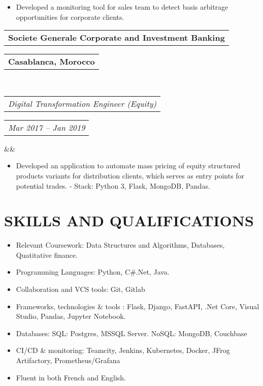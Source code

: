 \documentclass[11pt,a4paper,roman]{moderncv}        %
\makeatletter
\newcommand*{\customcventry}[7][.25em]{
  \begin{tabular}{@{}l} 
    {\bfseries #4}
  \end{tabular}
  \hfill%
  \begin{tabular}{l@{}}
     {\bfseries #5}
  \end{tabular} \\
  \begin{tabular}{@{}l} 
    {\itshape #3}
  \end{tabular}
  \hfill%
  \begin{tabular}{l@{}}
     {\itshape #2}
  \end{tabular}
  \ifx&#7&%
  \else{\\%
    \begin{minipage}{\maincolumnwidth}%
      \small#7%
    \end{minipage}}\fi%
  \par\addvspace{#1}}
\makeatother
\begin{document}
{{{{{\begin{itemize}
  	\newline - Stack: Python 3 (Pandas, Numpy), Flask, MongoDB, ElasticSearch Kibana.
  \item Developed a monitoring tool for sales team to detect basis arbitrage opportunities for corporate clients.
  
\end{itemize}
}

{\customcventry{Mar 2017 – Jan 2019}{Digital Transformation Engineer (Equity)}{Societe Generale Corporate and Investment Banking}{Casablanca, Morocco}{}{}
{\begin{itemize}
  \item Developed an application to automate mass pricing of equity structured products variants for distribution clients, which serves as entry points for potential trades.
  \newline - Stack: Python 3, Flask, MongoDB, Pandas.

  \end{itemize}
}



\section{SKILLS AND QUALIFICATIONS}
\begin{minipage}{\maincolumnwidth}%
	\small{
    	\begin{itemize}
          \item Relevant Coursework: Data Structures and Algorithms, Databases, Quatitative finance.
          \item Programming Languages: Python, C\#.Net, Java.
          \item Collaboration and VCS tools: Git, Gitlab
          \item Frameworks, technologies \& tools : Flask, Django, FastAPI, .Net Core, Visual Studio, Pandas,  Jupyter Notebook.
          \item Databases: SQL: Postgres, MSSQL Server. NoSQL: MongoDB, Couchbase
          \item CI/CD \& monitoring: Teamcity, Jenkins, Kubernetes, Docker, JFrog Artifactory, Prometheus/Grafana 
          \item Fluent in both French and English.
		\end{itemize}}%
\end{minipage}%
      
}
\nocite{*}


}}}}
\end{document}
